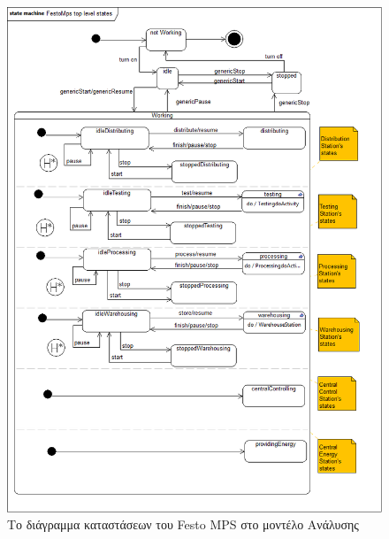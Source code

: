 \documentclass[a4paper,12pt,twoside]{report}
\begin{document}
{\begin{appendices}
			\begin{figure}[hp]
					\centering
					\includegraphics[scale=0.30]{AnalysisModel_stm-FestoMpsTopLevelStates.png}
					\caption{Το διάγραμμα καταστάσεων του Festo MPS στο μοντέλο Ανάλυσης}
					\label{φωτ:Το διάγραμμα καταστάσεων του Festo MPS στο μοντέλο Ανάλυσης}
			\end{figure}
			

\end{appendices}}
\end{document}
